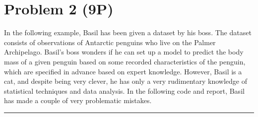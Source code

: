 \documentclass[
]{article}
\newenvironment{Shaded}{\begin{snugshade}}{\end{snugshade}}
\newcommand{\AttributeTok}[1]{\textcolor[rgb]{0.77,0.63,0.00}{#1}}
\newcommand{\CommentTok}[1]{\textcolor[rgb]{0.56,0.35,0.01}{\textit{#1}}}
\newcommand{\DocumentationTok}[1]{\textcolor[rgb]{0.56,0.35,0.01}{\textbf{\textit{#1}}}}
\newcommand{\FunctionTok}[1]{\textcolor[rgb]{0.00,0.00,0.00}{#1}}
\newcommand{\NormalTok}[1]{#1}
\newcommand{\OtherTok}[1]{\textcolor[rgb]{0.56,0.35,0.01}{#1}}
\newcommand{\SpecialCharTok}[1]{\textcolor[rgb]{0.00,0.00,0.00}{#1}}
\begin{document}
\hypertarget{problem-2-9p}{%
\section{Problem 2 (9P)}\label{problem-2-9p}}

In the following example, Basil has been given a dataset by his boss.
The dataset consists of observations of Antarctic penguins who live on
the Palmer Archipelago. Basil's boss wonders if he can set up a model to
predict the body mass of a given penguin based on some recorded
characteristics of the penguin, which are specified in advance based on
expert knowledge. However, Basil is a cat, and despite being very
clever, he has only a very rudimentary knowledge of statistical
techniques and data analysis. In the following code and report, Basil
has made a couple of very problematic mistakes.

\begin{center}\rule{0.5\linewidth}{0.5pt}\end{center}

\begin{Shaded}
\end{Shaded}
\end{document}
